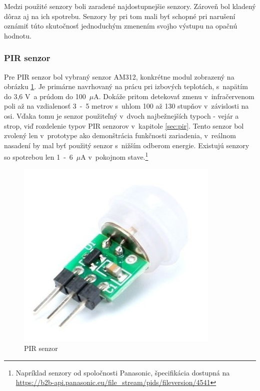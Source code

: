 Medzi použité senzory boli zaradené najdostupnejšie senzory. Zároveň bol kladený dôraz aj na ich spotrebu. Senzory by pri tom mali byť schopné pri narušení oznámiť túto skutočnosť jednoduchým zmenením svojho výstupu na opačnú hodnotu.

\subsubsection{PIR senzor}

Pre PIR senzor bol vybraný senzor AM312, konkrétne modul zobrazený na obrázku \ref{fig:pir}. Je primárne navrhovaný na prácu pri izbových teplotách, s~napätím do 3,6 V~a prúdom do 100~$\mu$A. Dokáže pritom detekovať zmenu v~infračervenom poli až na vzdialenosť 3~-~5 metrov s~uhlom 100 až 130 stupňov v~závislosti na osi. Vďaka tomu je senzor použiteľný v~dvoch najbežnejších typoch - vejár a strop, viď rozdelenie typov PIR senzorov v~kapitole \ref{sec:pir}.\cite{pir-datasheet}
Tento senzor bol zvolený len v~prototype ako demonštrácia funkčnosti zariadenia, v~reálnom nasadení by mal byť použitý senzor s~nižším odberom energie. Existujú senzory so spotrebou len 1~-~6~$\mu$A v~pokojnom stave.\footnote{Napríklad senzory od spoločnosti Panasonic, špecifikácia dostupná na \url{https://b2b-api.panasonic.eu/file_stream/pids/fileversion/4541}}

\begin{figure}[ht]
    \centering
    \includegraphics[scale=0.5]{obrazky-figures/pir.jpg}
    \caption[PIR senzor]{PIR senzor\footnotemark}
    \label{fig:pir}
\end{figure}

